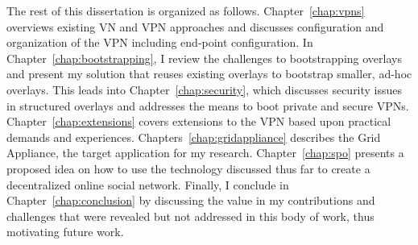 The rest of this dissertation is organized as follows.
Chapter~\ref{chap:vpns} overviews existing VN and VPN approaches and discusses
configuration and organization of the VPN including end-point configuration.
In Chapter~\ref{chap:bootstrapping}, I review the challenges to bootstrapping
overlays and present my solution that reuses existing overlays to bootstrap
smaller, ad-hoc overlays.  This leads into Chapter~\ref{chap:security}, which
discusses security issues in structured overlays and addresses the means to
boot private and secure VPNs.  Chapter~\ref{chap:extensions} covers extensions
to the VPN based upon practical demands and experiences.
Chapters~\ref{chap:gridappliance} describes the Grid Appliance, the target
application for my research.  Chapter~\ref{chap:spo} presents a proposed idea
on how to use the technology discussed thus far to create a decentralized
online social network.  Finally, I conclude in Chapter~\ref{chap:conclusion}
by discussing the value in my contributions and challenges that were revealed
but not addressed in this body of work, thus motivating future work.
